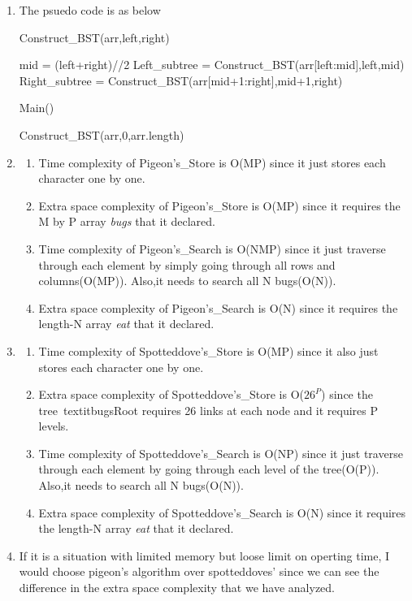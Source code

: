 \documentclass{article}
\begin{document}
\begin{CJK*}{UTF8}{bsmi}
\begin{enumerate}
    \item The psuedo code is as below
    \begin{algorithm}[H]
        \caption{Construct\_BST(arr,left,right)}
        \begin{algorithmic}
        \State mid = (left+right)//2
    \State Left\_subtree = Construct\_BST(arr[left:mid],left,mid) 
        \State Right\_subtree = Construct\_BST(arr[mid+1:right],mid+1,right)      
        \EndWhile
        \end{algorithmic}
        \end{algorithm}
    \begin{algorithm}[H]
        \caption{Main()}
        \begin{algorithmic}
         \State Construct\_BST(arr,0,arr.length)
        \end{algorithmic}
    \end{algorithm}

\item 
    \begin{enumerate}
        \item Time complexity of Pigeon's\_Store is O(MP) since it just stores each character one by one.
        \item Extra space complexity of Pigeon's\_Store is O(MP) since it requires the M by P array \textit{bugs} that it declared.
        \item Time complexity of Pigeon's\_Search is O(NMP) since it just traverse through each element by simply going through all rows and columns(O(MP)). Also,it needs to search all N bugs(O(N)). 
        \item Extra space complexity of Pigeon's\_Search is O(N) since it requires the length-N array \textit{eat} that it declared.
    \end{enumerate}
\item 
    \begin{enumerate}
        \item Time complexity of Spotteddove's\_Store is O(MP) since it also just stores each character one by one.
        \item Extra space complexity of Spotteddove's\_Store is O($26^P$) since the tree\ textit{bugsRoot} requires 26 links at each node and it requires P levels.
        \item Time complexity of Spotteddove's\_Search is O(NP) since it just traverse through each element by going through each level of the tree(O(P)). Also,it needs to search all N bugs(O(N)). 
        \item Extra space complexity of Spotteddove's\_Search is O(N) since it requires the length-N array \textit{eat} that it declared.
    \end{enumerate}
\item If it is a situation with limited memory but loose limit on operting time, I would choose pigeon's algorithm over spotteddoves' since we can see the difference in the extra space complexity that we have analyzed.
\end{enumerate}


\end{CJK*}
\end{document}
